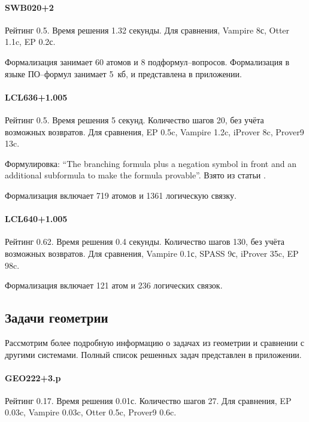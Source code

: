 \paragraph{SWB020+2}
Рейтинг 0.5. Время решения 1.32 секунды. Для сравнения, Vampire 8с, Otter 1.1c, EP 0.2с.

Формализация занимает 60 атомов и 8 подформул--вопросов. Формализация в языке ПО--формул занимает 5~кб, и представлена в приложении.

\paragraph{LCL636+1.005}
Рейтинг 0.5. Время решения 5 секунд. Количество шагов 20, без учёта возможных возвратов. Для сравнения, EP 0.5c, Vampire 1.2c, iProver 8c, Prover9 13c.

Формулировка: ``The branching formula plus a negation symbol in front and an additional subformula to make the formula provable''.
Взято из статьи \cite{SourceLCL}.

Формализация включает 719 атомов и 1361 логическую связку.


\paragraph{LCL640+1.005}
Рейтинг 0.62. Время решения 0.4 секунды. Количество шагов 130, без учёта возможных возвратов. Для сравнения, Vampire 0.1с, SPASS 9с, iProver 35c, EP 98c.

Формализация включает 121 атом и 236 логических связок.


\subsection{Задачи геометрии}
Рассмотрим более подробную информацию о задачах из геометрии и сравнении с другими системами. Полный список решенных задач представлен в приложении.

\paragraph{GEO222+3.p}
Рейтинг 0.17. Время решения 0.01с. Количество шагов 27. Для сравнения, EP 0.03c, Vampire 0.03c, Otter 0.5c, Prover9 0.6c.

